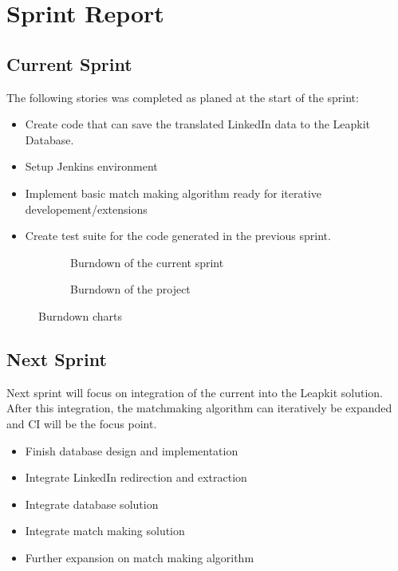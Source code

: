 \section{Sprint Report}

\subsection{Current Sprint}

The following stories was completed as planed at the start of the sprint:
\begin{itemize}
    \item Create code that can save the translated LinkedIn data to the Leapkit Database.
    \item Setup Jenkins environment
    \item Implement basic match making algorithm ready for iterative developement/extensions
    \item Create test suite for the code generated in the previous sprint.
\end{itemize}

\begin{figure}[!ht]
    \centering
    \begin{subfigure}[b]{0.5\textwidth}
        \scalebox{.6}{}
        \caption{Burndown of the current sprint}
        \label{fig:burndownSprint}
    \end{subfigure}%
    \begin{subfigure}[b]{0.5\textwidth}
        \scalebox{.7}{}
        \caption{Burndown of the project}
        \label{fig:burndownProject}
    \end{subfigure}
    \caption{Burndown charts}
\end{figure}

\subsection{Next Sprint}
Next sprint will focus on integration of the current into the Leapkit solution. After this integration, the matchmaking algorithm can iteratively be expanded and CI will be the focus point.
\begin{itemize}
\item Finish database design and implementation
\item Integrate LinkedIn redirection and extraction
\item Integrate database solution
\item Integrate match making solution
\item Further expansion on match making algorithm
\end{itemize}